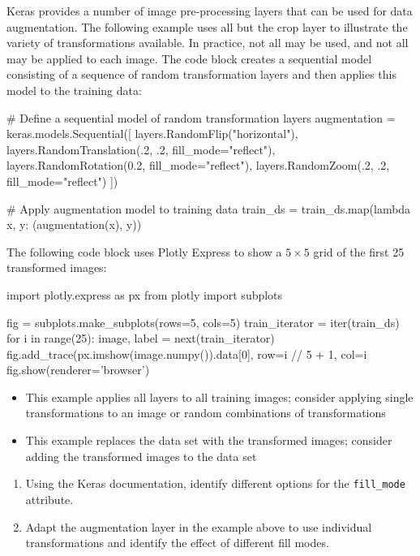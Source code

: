 Keras provides a number of image pre-processing layers that can be used for data augmentation. The following example uses all but the crop layer to illustrate the variety of transformations available. In practice, not all may be used, and not all may be applied to each image. The code block creates a sequential model consisting of a sequence of random transformation layers and then applies this model to the training data:

\begin{pythoncode}
# Define a sequential model of random transformation layers
augmentation = keras.models.Sequential([
    layers.RandomFlip("horizontal"),
    layers.RandomTranslation(.2, .2, fill_mode="reflect"),
    layers.RandomRotation(0.2, fill_mode="reflect"),
    layers.RandomZoom(.2, .2, fill_mode="reflect")
])

# Apply augmentation model to training data
train_ds = train_ds.map(lambda x, y: (augmentation(x), y))
\end{pythoncode}

The following code block uses Plotly Express to show a $5 \times 5$ grid of the first 25 transformed images:
\begin{pythoncode}
import plotly.express as px
from plotly import subplots

fig = subplots.make_subplots(rows=5, cols=5)
train_iterator = iter(train_ds)
for i in range(25):
    image, label = next(train_iterator)
    fig.add_trace(px.imshow(image.numpy()).data[0], 
                  row=i // 5 + 1, col=i %
fig.show(renderer='browser')
\end{pythoncode}

\begin{infobox}
\begin{itemize}
   \item This example applies all layers to all training images; consider applying single transformations to an image or random combinations of transformations
   \item This example replaces the data set with the transformed images; consider adding the transformed images to the data set
\end{itemize}
\end{infobox}


\begin{exercisebox}
\begin{enumerate}
  \item Using the Keras documentation, identify different options for the \texttt{fill\_mode} attribute.
  \item Adapt the augmentation layer in the example above to use individual transformations and identify the effect of different fill modes.
\end{enumerate}
\end{exercisebox}


